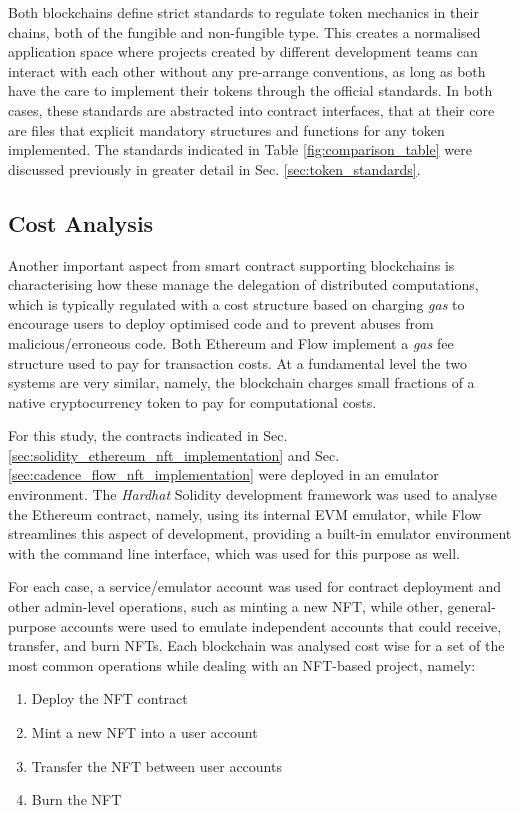 \documentclass[../main.tex]{subfiles}
\begin{document}
\par
Both blockchains define strict standards to regulate token mechanics in their chains, both of the fungible and non-fungible type. This creates a normalised application space where projects created by different development teams can interact with each other without any pre-arrange conventions, as long as both have the care to implement their tokens through the official standards. In both cases, these standards are abstracted into contract interfaces, that at their core are files that explicit mandatory structures and functions for any token implemented. The standards indicated in Table \ref{fig:comparison_table} were discussed previously in greater detail in Sec. \ref{sec:token_standards}.


\subsection{Cost Analysis}
\label{sec:cost_analysis}
Another important aspect from smart contract supporting blockchains is characterising how these manage the delegation of distributed computations, which is typically regulated with a cost structure based on charging \textit{gas} to encourage users to deploy optimised code and to prevent abuses from malicious/erroneous code. Both Ethereum and Flow implement a \textit{gas} fee structure used to pay for transaction costs. At a fundamental level the two systems are very similar, namely, the blockchain charges small fractions of a native cryptocurrency token to pay for computational costs.
\par
For this study, the contracts indicated in Sec. \ref{sec:solidity_ethereum_nft_implementation} and Sec. \ref{sec:cadence_flow_nft_implementation} were deployed in an emulator environment. The \textit{Hardhat} Solidity development framework was used to analyse the Ethereum contract, namely, using its internal EVM emulator, while Flow streamlines this aspect of development, providing a built-in emulator environment with the command line interface, which was used for this purpose as well.
\par
For each case, a service/emulator account was used for contract deployment and other admin-level operations, such as minting a new NFT, while other, general-purpose accounts were used to emulate independent accounts that could receive, transfer, and burn NFTs. Each blockchain was analysed cost wise for a set of the most common operations while dealing with an NFT-based project, namely:
\begin{enumerate}
    \item {Deploy the NFT contract}
    \item {Mint a new NFT into a user account}
    \item {Transfer the NFT between user accounts}
    \item {Burn the NFT}
\end{enumerate}
\end{document}

